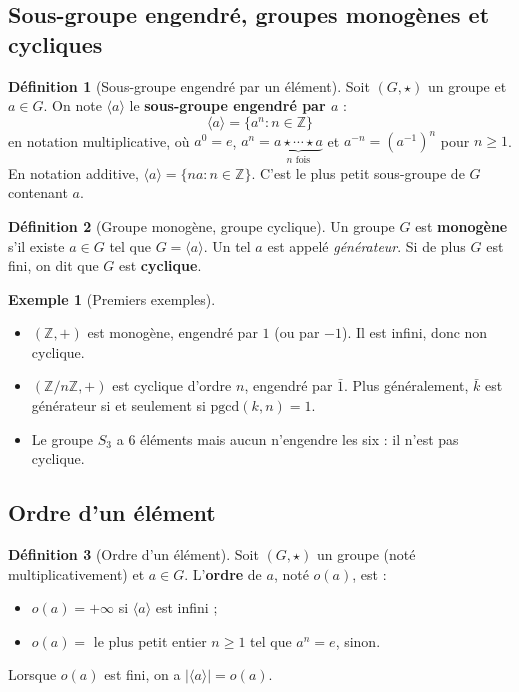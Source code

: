 \documentclass[12pt,a4paper]{report}
\theoremstyle{definition}
\newtheorem{definition}{Définition}[section]
\newtheorem{exemple}{Exemple}[section]
\theoremstyle{remark}
\begin{document}
\subsection{Sous-groupe engendré, groupes monogènes et cycliques}

\begin{definition}[Sous-groupe engendré par un élément]
Soit $(G, \star)$ un groupe et $a \in G$. On note $\langle a \rangle$ le \textbf{sous-groupe engendré par $a$} :
\[ \langle a \rangle = \{a^n : n \in \mathbb{Z}\} \]
en notation multiplicative, où $a^0 = e$, $a^n = \underbrace{a \star \cdots \star a}_{n \text{ fois}}$ et $a^{-n} = (a^{-1})^n$ pour $n \ge 1$. En notation additive, $\langle a \rangle = \{na : n \in \mathbb{Z}\}$. C'est le plus petit sous-groupe de $G$ contenant $a$.
\end{definition}

\begin{definition}[Groupe monogène, groupe cyclique]
Un groupe $G$ est \textbf{monogène} s'il existe $a \in G$ tel que $G = \langle a \rangle$. Un tel $a$ est appelé \emph{générateur}. Si de plus $G$ est fini, on dit que $G$ est \textbf{cyclique}.
\end{definition}

\begin{exemple}[Premiers exemples]
\begin{itemize}
    \item $(\mathbb{Z}, +)$ est monogène, engendré par $1$ (ou par $-1$). Il est infini, donc non cyclique.
    \item $(\mathbb{Z}/n\mathbb{Z}, +)$ est cyclique d'ordre $n$, engendré par $\bar{1}$. Plus généralement, $\bar{k}$ est générateur si et seulement si $\mathrm{pgcd}(k, n) = 1$.
    \item Le groupe $S_3$ a $6$ éléments mais aucun n'engendre les six : il n'est pas cyclique.
\end{itemize}
\end{exemple}

\subsection{Ordre d'un élément}

\begin{definition}[Ordre d'un élément]
Soit $(G, \star)$ un groupe (noté multiplicativement) et $a \in G$. L'\textbf{ordre} de $a$, noté $o(a)$, est :
\begin{itemize}
    \item $o(a) = +\infty$ si $\langle a \rangle$ est infini ;
    \item $o(a) = $ le plus petit entier $n \ge 1$ tel que $a^n = e$, sinon.
\end{itemize}
Lorsque $o(a)$ est fini, on a $|\langle a \rangle| = o(a)$.
\end{definition}
\end{document}
